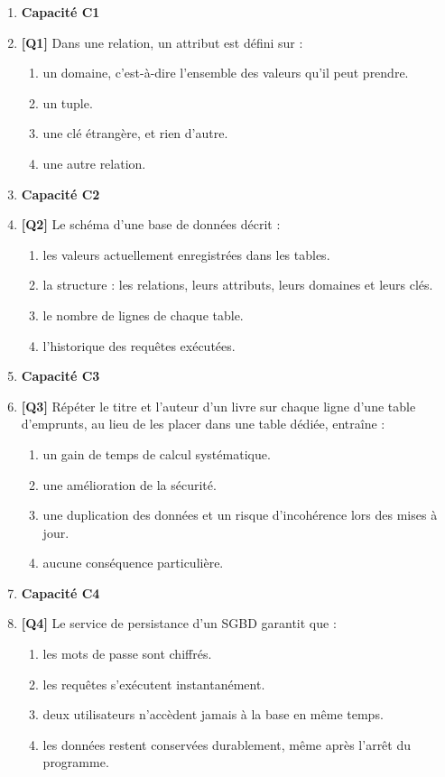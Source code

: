 \begin{enumerate}

\item[] \textbf{Capacité C1}

\item \textbf{[Q1]} Dans une relation, un attribut est défini sur :
  \begin{enumerate}[label=\Alph*.]
    \item un domaine, c'est-à-dire l'ensemble des valeurs qu'il peut prendre.
    \item un tuple.
    \item une clé étrangère, et rien d'autre.
    \item une autre relation.
  \end{enumerate}

\item[] \textbf{Capacité C2}

\item \textbf{[Q2]} Le schéma d'une base de données décrit :
  \begin{enumerate}[label=\Alph*.]
    \item les valeurs actuellement enregistrées dans les tables.
    \item la structure : les relations, leurs attributs, leurs domaines et leurs clés.
    \item le nombre de lignes de chaque table.
    \item l'historique des requêtes exécutées.
  \end{enumerate}

\item[] \textbf{Capacité C3}

\item \textbf{[Q3]} Répéter le titre et l'auteur d'un livre sur chaque ligne d'une table d'emprunts, au lieu de les placer dans une table dédiée, entraîne :
  \begin{enumerate}[label=\Alph*.]
    \item un gain de temps de calcul systématique.
    \item une amélioration de la sécurité.
    \item une duplication des données et un risque d'incohérence lors des mises à jour.
    \item aucune conséquence particulière.
  \end{enumerate}

\item[] \textbf{Capacité C4}

\item \textbf{[Q4]} Le service de persistance d'un SGBD garantit que :
  \begin{enumerate}[label=\Alph*.]
    \item les mots de passe sont chiffrés.
    \item les requêtes s'exécutent instantanément.
    \item deux utilisateurs n'accèdent jamais à la base en même temps.
    \item les données restent conservées durablement, même après l'arrêt du programme.
  \end{enumerate}


\end{enumerate}
